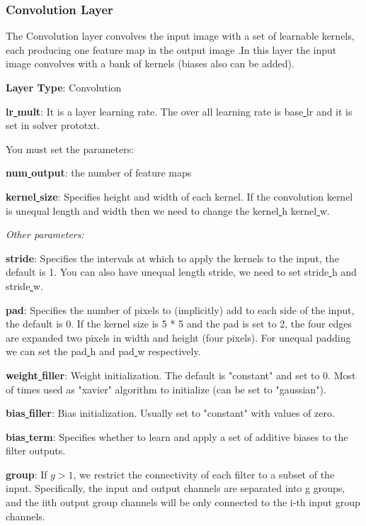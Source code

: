 \documentclass[12pt]{article}
\begin{document}
\subsubsection{Convolution Layer}

The Convolution layer convolves the input image with a set of learnable kernels, each producing one feature map in the output image \cite{Berkeley}.In this layer the input image convolves with a bank of kernels  (biases also can be added).

\noindent \textbf{Layer Type}: Convolution

\noindent \textbf{lr\underline{{ }{ }}mult}: It is a layer learning rate. The over all learning rate is base\underline{{ }{ }}lr and it is set in solver prototxt.

\noindent You must set the parameters:

\noindent \textbf{num\underline{{ }{ }}output}: the number of feature maps

\noindent \textbf{kernel\underline{{ }{ }}size}: Specifies height and width of each kernel. If the convolution kernel is unequal length and width then we need to change the kernel\underline{{ }{ }}h kernel\underline{{ }{ }}w.

\emph{Other parameters:}

\noindent \textbf{stride}: Specifies the intervals at which to apply the kernels to the input, the default is 1. You can also have unequal length stride, we need to set stride\underline{{ }{ }}h and stride\underline{{ }{ }}w.

\noindent \textbf{pad}: Specifies the number of pixels to (implicitly) add to each side of the input, the default is 0. If the kernel size is 5 * 5 and the pad is set to 2, the four edges are expanded two pixels in width and height (four pixels). For unequal padding we can set the pad\underline{{ }{ }}h and pad\underline{{ }{ }}w respectively.

\noindent  \textbf{weight\underline{{ }{ }}filler}: Weight initialization. The default is "constant" and set to 0. Most of times used as "xavier" algorithm to initialize (can be set to "gaussian").

\noindent   \textbf{bias\underline{{ }{ }}filler}: Bias initialization. Usually set to "constant" with values of zero.

\noindent   \textbf{bias\underline{{ }{ }}term}:  Specifies whether to learn and apply a set of additive biases to the filter outputs.

\noindent \textbf{group}:  If $g > 1$, we restrict the connectivity of each filter to a subset of the input. Specifically, the input and output channels are separated into g groups, and the iith output group channels will be only connected to the i-th input group channels.
\end{document}
